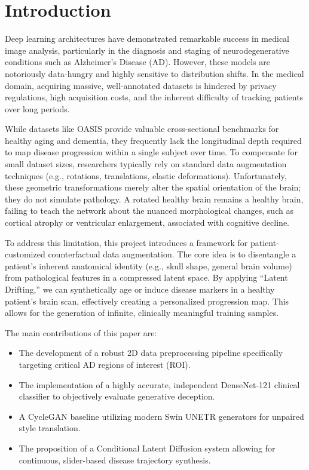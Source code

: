 \documentclass[conference]{IEEEtran}
\begin{document}
\section{Introduction}
Deep learning architectures have demonstrated remarkable success in medical image analysis, particularly in the diagnosis and staging of neurodegenerative conditions such as Alzheimer's Disease (AD). However, these models are notoriously data-hungry and highly sensitive to distribution shifts. In the medical domain, acquiring massive, well-annotated datasets is hindered by privacy regulations, high acquisition costs, and the inherent difficulty of tracking patients over long periods.

While datasets like OASIS provide valuable cross-sectional benchmarks for healthy aging and dementia, they frequently lack the longitudinal depth required to map disease progression within a single subject over time. To compensate for small dataset sizes, researchers typically rely on standard data augmentation techniques (e.g., rotations, translations, elastic deformations). Unfortunately, these geometric transformations merely alter the spatial orientation of the brain; they do not simulate pathology. A rotated healthy brain remains a healthy brain, failing to teach the network about the nuanced morphological changes, such as cortical atrophy or ventricular enlargement, associated with cognitive decline.

To address this limitation, this project introduces a framework for patient-customized counterfactual data augmentation. The core idea is to disentangle a patient's inherent anatomical identity (e.g., skull shape, general brain volume) from pathological features in a compressed latent space. By applying ``Latent Drifting,'' we can synthetically age or induce disease markers in a healthy patient's brain scan, effectively creating a personalized progression map. This allows for the generation of infinite, clinically meaningful training samples.

The main contributions of this paper are:
\begin{itemize}
    \item The development of a robust 2D data preprocessing pipeline specifically targeting critical AD regions of interest (ROI).
    \item The implementation of a highly accurate, independent DenseNet-121 clinical classifier to objectively evaluate generative deception.
    \item A CycleGAN baseline utilizing modern Swin UNETR generators for unpaired style translation.
    \item The proposition of a Conditional Latent Diffusion system allowing for continuous, slider-based disease trajectory synthesis.
\end{itemize}
\end{document}
